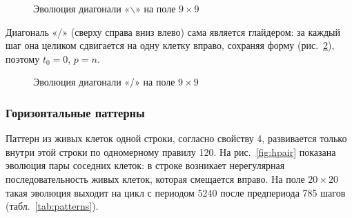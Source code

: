 \documentclass[a4paper,14pt]{extarticle}
\newcommand{\consolesmall}{\fontsize{7}{7.35}\selectfont\ttfamily}
\newcommand{\console}[2][\consolesmall]{}
\begin{document}
\begin{figure}[H]
	\centering
	\begin{minipage}{0.23\textwidth}\centering\console{diagb_0}\end{minipage}
	\begin{minipage}{0.23\textwidth}\centering\console{diagb_1}\end{minipage}
	\begin{minipage}{0.23\textwidth}\centering\console{diagb_2}\end{minipage}
	\begin{minipage}{0.23\textwidth}\centering\console{diagb_3}\end{minipage}
	\caption{Эволюция диагонали «$\backslash$» на поле $9 \times 9$}
	\label{fig:diagb}
\end{figure}

Диагональ «/» (сверху справа вниз влево) сама является глайдером: за каждый шаг она целиком сдвигается на одну клетку вправо, сохраняя форму (рис.~\ref{fig:diagf}), поэтому $t_0 = 0$, $p = n$.

\begin{figure}[H]
	\centering
	\begin{minipage}{0.23\textwidth}\centering\console{diagf_0}\end{minipage}
	\begin{minipage}{0.23\textwidth}\centering\console{diagf_1}\end{minipage}
	\begin{minipage}{0.23\textwidth}\centering\console{diagf_2}\end{minipage}
	\begin{minipage}{0.23\textwidth}\centering\console{diagf_3}\end{minipage}
	\caption{Эволюция диагонали «/» на поле $9 \times 9$}
	\label{fig:diagf}
\end{figure}

\subsubsection*{Горизонтальные паттерны}

Паттерн из живых клеток одной строки, согласно свойству 4, развивается только внутри этой строки по одномерному правилу 120. На рис.~\ref{fig:hpair} показана эволюция пары соседних клеток: в строке возникает нерегулярная последовательность живых клеток, которая смещается вправо. На поле $20 \times 20$ такая эволюция выходит на цикл с периодом 5240 после предпериода 785 шагов (табл.~\ref{tab:patterns}).
\end{document}

